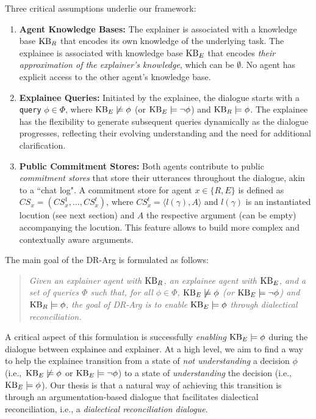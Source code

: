 \documentclass{article}
\begin{document}
Three critical assumptions underlie our framework:

\begin{enumerate}


    \item \textbf{Agent Knowledge Bases:} The explainer is associated with a knowledge base $\mathrm{KB}_R$ that encodes its own knowledge of the underlying task. The explainee is associated with knowledge base $\mathrm{KB}_E$ that encodes \emph{their approximation of the explainer's knowledge}, which can be $\emptyset$. No agent has explicit access to the other agent's knowledge base.
    
    
    \item \textbf{Explainee Queries:} Initiated by the explainee, the dialogue starts with a \texttt{query} $\phi \in \Phi$, where $\mathrm{KB}_E \not \models \phi$ (or $\mathrm{KB}_E \models \neg \phi$) and $\mathrm{KB}_R \models \phi$. The explainee has the flexibility to generate subsequent queries dynamically as the dialogue progresses, reflecting their evolving understanding and the need for additional clarification.

    \item \textbf{Public Commitment Stores:} Both agents contribute to public \textit{commitment stores} that store their utterances throughout the dialogue, akin to a ``chat log". A commitment store for agent $x\in \{R, E\}$ is defined as $CS_x = ( CS_x^1, \ldots, CS_x^t )$, where $CS_x^t = \langle l(\gamma), A \rangle$ and $l(\gamma)$ is an instantiated locution (see next section) and $A$ the respective argument (can be empty) accompanying the locution. This feature allows to build more complex and contextually aware arguments.
\end{enumerate}

\noindent The main goal of the DR-Arg is formulated as follows:


\begin{quote}
    \emph{Given an explainer agent with $\mathrm{KB}_R$, an explainee agent with $\mathrm{KB}_E$, and a set of queries $\Phi$ such that, for all $\phi \in \Phi$, $\mathrm{KB}_E \not \models \phi$ (or $\mathrm{KB}_E \models \neg \phi$) and $\mathrm{KB}_R \models \phi$, the goal of DR-Arg is to \emph{enable} $\mathrm{KB}_E \models \phi$ through dialectical reconciliation.}
\end{quote}




A critical aspect of this formulation is successfully \textit{enabling} $\mathrm{KB}_E \models \phi$ during the dialogue between explainee and explainer. At a high level, we aim to find a way to help the explainee transition from a state of \textit{not understanding} a decision $\phi$ (i.e.,~$\mathrm{KB}_E \not \models \phi$ or $\mathrm{KB}_E \models \neg \phi$) to a state of \textit{understanding} the decision (i.e.,~$\mathrm{KB}_E \models \phi$). Our thesis is that a natural way of achieving this transition is through an argumentation-based dialogue that facilitates dialectical reconciliation, i.e., a \textit{dialectical reconciliation dialogue}.
\end{document}
